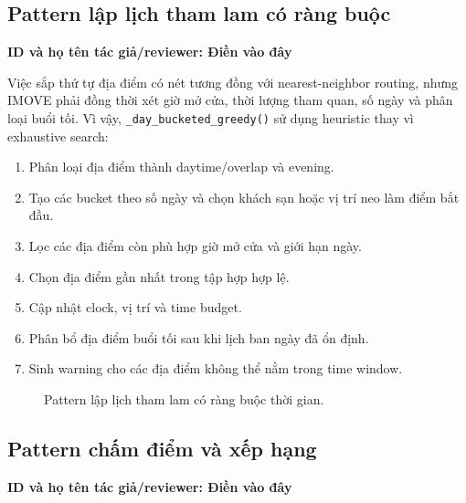 \documentclass[12pt,a4paper]{article}
\newcommand{\tacgia}{%
  \begin{tcolorbox}[colback=blue!3,colframe=blue!25,boxrule=0.4pt,arc=1mm]
    \small\textbf{ID và họ tên tác giả/reviewer: Điền vào đây}
  \end{tcolorbox}
}
\begin{document}
\subsection{Pattern lập lịch tham lam có ràng buộc}
\tacgia

Việc sắp thứ tự địa điểm có nét tương đồng với nearest-neighbor routing, nhưng IMOVE phải đồng thời xét giờ mở cửa, thời lượng tham quan, số ngày và phân loại buổi tối. Vì vậy, \texttt{\_day\_bucketed\_greedy()} sử dụng heuristic thay vì exhaustive search:

\begin{enumerate}
    \item Phân loại địa điểm thành daytime/overlap và evening.
    \item Tạo các bucket theo số ngày và chọn khách sạn hoặc vị trí neo làm điểm bắt đầu.
    \item Lọc các địa điểm còn phù hợp giờ mở cửa và giới hạn ngày.
    \item Chọn địa điểm gần nhất trong tập hợp hợp lệ.
    \item Cập nhật clock, vị trí và time budget.
    \item Phân bổ địa điểm buổi tối sau khi lịch ban ngày đã ổn định.
    \item Sinh warning cho các địa điểm không thể nằm trong time window.
\end{enumerate}

\begin{figure}[H]
\centering
{}
\caption{Pattern lập lịch tham lam có ràng buộc thời gian.}
\label{fig:greedy-pattern}
\end{figure}

\subsection{Pattern chấm điểm và xếp hạng}
\tacgia
\end{document}
